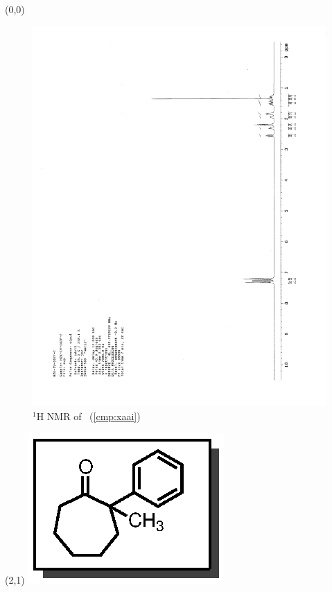\begin{textblock}{20}(0,0)
\begin{figure}[htb]
\caption{$^1$H NMR of \CMPxaai\ (\ref{cmp:xaai})}
\includegraphics[scale=0.75, trim = 0mm 0mm 0mm 5mm,
clip]{chp_asymmetric/images/nmr/xaaiH}
\vspace{-100pt}
\end{figure}
\end{textblock}
\begin{textblock}{1}(2,1)
\includegraphics[scale=0.8, angle=90]{chp_asymmetric/images/xaai}
\end{textblock}
